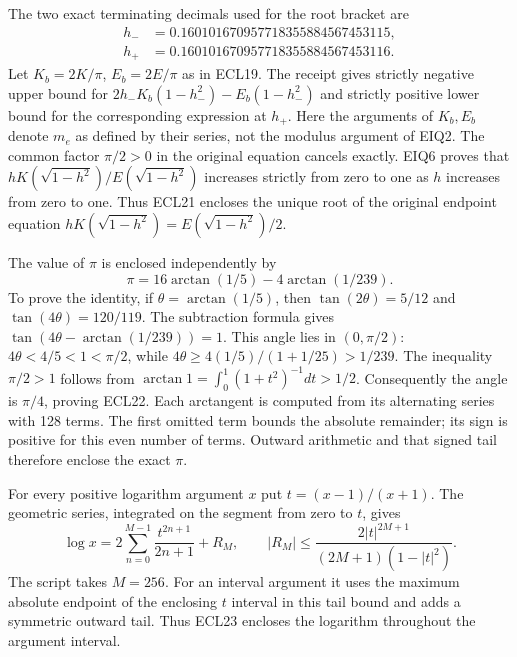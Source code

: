 \documentclass[11pt,a4paper]{article}
\begin{document}
The two exact terminating decimals used for the root bracket are
\begin{equation}\tag{ECL21}
\begin{split}
h_-&=0.160101670957718355884567453115,\\
h_+&=0.160101670957718355884567453116.
\end{split}
\end{equation}
Let $K_b=2K/\pi$, $E_b=2E/\pi$ as in ECL19.
The receipt gives strictly negative upper bound for
$2h_-K_b(1-h_-^2)-E_b(1-h_-^2)$ and strictly positive lower
bound for the corresponding expression at $h_+$.
Here the arguments of $K_b,E_b$ denote $m_e$ as defined by
their series, not the modulus argument of EIQ2.
The common factor $\pi/2>0$ in the original equation cancels
exactly. EIQ6 proves that $hK(\sqrt{1-h^2})/
E(\sqrt{1-h^2})$ increases strictly from zero to one as
$h$ increases from zero to one. Thus ECL21 encloses the
unique root of the original endpoint equation
$hK(\sqrt{1-h^2})=E(\sqrt{1-h^2})/2$.

The value of $\pi$ is enclosed independently by
\begin{equation}\tag{ECL22}
\pi=16\arctan(1/5)-4\arctan(1/239).
\end{equation}
To prove the identity, if $\theta=\arctan(1/5)$, then
$\tan(2\theta)=5/12$ and $\tan(4\theta)=120/119$.
The subtraction formula gives
$\tan(4\theta-\arctan(1/239))=1$.
This angle lies in $(0,\pi/2)$:
$4\theta<4/5<1<\pi/2$, while
$4\theta\geq4(1/5)/(1+1/25)>1/239$.
The inequality $\pi/2>1$ follows from
$\arctan1=\int_0^1(1+t^2)^{-1}dt>1/2$.
Consequently the angle is $\pi/4$, proving ECL22.
Each arctangent is computed from its alternating series with
128 terms. The first omitted term bounds the absolute remainder;
its sign is positive for this even number of terms. Outward
arithmetic and that signed tail therefore enclose the exact $\pi$.

For every positive logarithm argument $x$ put $t=(x-1)/(x+1)$.
The geometric series, integrated on the segment from zero to $t$,
gives
\begin{equation}\tag{ECL23}
\log x=2\sum_{n=0}^{M-1}\frac{t^{2n+1}}{2n+1}
+R_M,\qquad
|R_M|\leq
\frac{2|t|^{2M+1}}{(2M+1)(1-|t|^2)}.
\end{equation}
The script takes $M=256$. For an interval argument it uses
the maximum absolute endpoint of the enclosing $t$ interval
in this tail bound and adds a symmetric outward tail. Thus
ECL23 encloses the logarithm throughout the argument interval.
\end{document}
